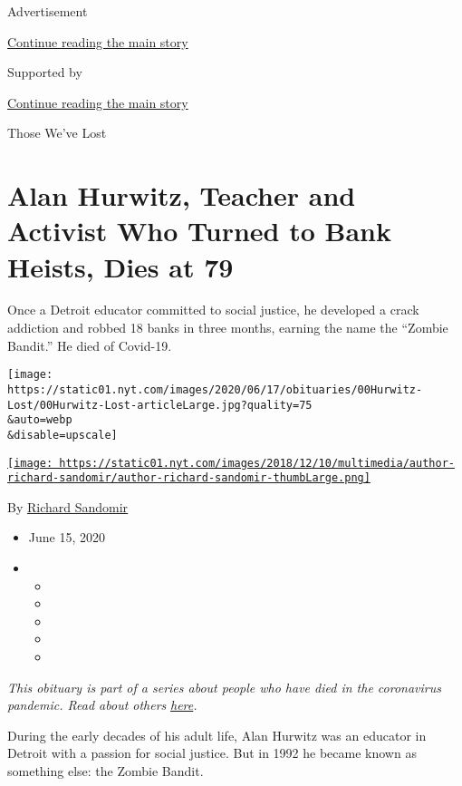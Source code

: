 Advertisement

\protect\hyperlink{after-top}{Continue reading the main story}

Supported by

\protect\hyperlink{after-sponsor}{Continue reading the main story}

Those We've Lost

\hypertarget{alan-hurwitz-teacher-and-activist-who-turned-to-bank-heists-dies-at-79}{%
\section{Alan Hurwitz, Teacher and Activist Who Turned to Bank Heists,
Dies at
79}\label{alan-hurwitz-teacher-and-activist-who-turned-to-bank-heists-dies-at-79}}

Once a Detroit educator committed to social justice, he developed a
crack addiction and robbed 18 banks in three months, earning the name
the ``Zombie Bandit.'' He died of Covid-19.

\texttt{[image: https://static01.nyt.com/images/2020/06/17/obituaries/00Hurwitz-Lost/00Hurwitz-Lost-articleLarge.jpg?quality=75\\\&auto=webp\\\&disable=upscale]}

\href{https://www.nytimes.com/by/richard-sandomir}{\texttt{[image: https://static01.nyt.com/images/2018/12/10/multimedia/author-richard-sandomir/author-richard-sandomir-thumbLarge.png]}}

By \href{https://www.nytimes.com/by/richard-sandomir}{Richard Sandomir}

\begin{itemize}
\item
  June 15, 2020
\item
  \begin{itemize}
  \item
  \item
  \item
  \item
  \item
  \end{itemize}
\end{itemize}

\emph{This obituary is part of a series about people who have died in
the coronavirus pandemic. Read about others}
\href{https://www.nytimes.com/interactive/2020/obituaries/people-died-coronavirus-obituaries.html}{\emph{here}}\emph{.}

During the early decades of his adult life, Alan Hurwitz was an educator
in Detroit with a passion for social justice. But in 1992 he became
known as something else: the Zombie Bandit.

